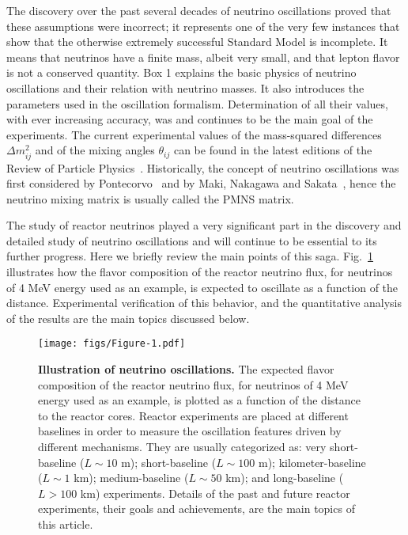 \documentclass[aps,twocolumn,preprintnumbers,amsmath,superscriptaddress,amssymb,floats,nofootinbib]{revtex4-1}
\begin{document}
The discovery over the past several decades
of neutrino oscillations proved that these assumptions were incorrect; it
represents one of the very few instances that show that the otherwise
extremely successful Standard Model is incomplete. It means that
neutrinos have a finite mass, albeit very small, and that lepton flavor is not a conserved quantity.
Box 1 explains the basic physics of neutrino oscillations and their relation with neutrino masses. It
also introduces the parameters used in the oscillation formalism. Determination of all their values,
with ever increasing accuracy,
was and continues to be the main goal of the experiments.
The current experimental values of the mass-squared differences $\Delta m^2_{ij}$ and of the mixing angles $\theta_{ij}$ can be found
in the latest editions of the Review of Particle Physics~\cite{PDG14}.
Historically, the concept of neutrino oscillations was first considered by Pontecorvo~\cite{Pontecorvo57, Pontecorvo58}
and by Maki, Nakagawa and Sakata~\cite{MNS62}, hence the neutrino mixing matrix is usually called the PMNS matrix.

The study of reactor neutrinos played a very significant part in the discovery and detailed study of neutrino oscillations and will continue 
to be essential to its further progress. Here we briefly review
the main points of this saga. Fig.~\ref{fig:intro1} illustrates how the flavor composition of the reactor neutrino flux, for neutrinos of 4 MeV energy
used as an example, is expected to oscillate as a function of the distance. Experimental verification of this behavior, and the quantitative analysis of the
results are the main topics discussed below.

\begin{figure}[tb]
\begin{centering}
\texttt{[image: figs/Figure-1.pdf]}
\par\end{centering}
\caption{\label{fig:intro1} {\bf Illustration of neutrino oscillations.} The expected flavor composition of the reactor neutrino flux, for neutrinos of 4 MeV energy
used as an example,  is plotted as a function of the distance to the reactor cores. Reactor experiments are placed at different baselines in order to measure the oscillation features driven by different mechanisms. They are usually categorized as: very short-baseline ($L\sim10$ m); short-baseline ($L\sim100$ m); kilometer-baseline ($L\sim1$ km); medium-baseline ($L\sim50$ km); and long-baseline ($L>100$ km) experiments. Details of the past and future reactor experiments, their goals and achievements, are the main topics of this article.
}
\end{figure}
\end{document}
